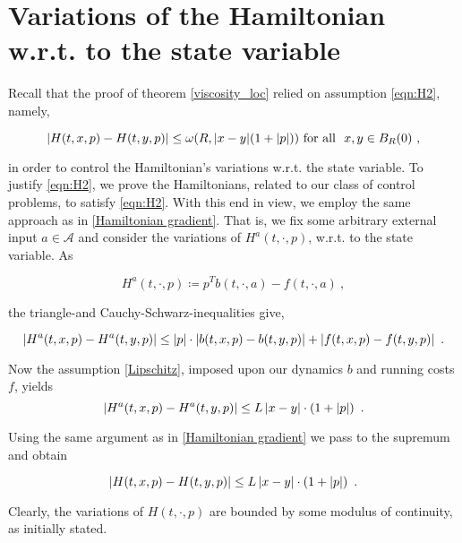 \section{Variations of the Hamiltonian w.r.t. to the state variable}
\label{state hamiltonian}

Recall that the proof of theorem \ref{viscosity_loc} relied on assumption \eqref{eqn:H2}, namely,

\begin{equation*}
	\lvert H(t, x, p) - H(t, y, p) \rvert \leq \omega(R, \lvert x - y \rvert (1 + \lvert p \rvert)) \hbox{ for all } \ x, y \in B_R(0) \ ,
\end{equation*}

in order to control the Hamiltonian's variations w.r.t. the state variable. To justify \eqref{eqn:H2}, we prove the Hamiltonians, related to our class of control problems, to satisfy \eqref{eqn:H2}. With this end in view, we employ the same approach as in \ref{Hamiltonian gradient}. That is, we fix some arbitrary external input $ a \in \mathcal{A} $ and consider the variations of
$ H^{a}(t, \cdot, p) $, w.r.t. to the state variable. As

\begin{equation*}
	H^{a}(t, \cdot, p) \coloneqq p^{T} b(t, \cdot, a) - f(t, \cdot, a) \ ,
\end{equation*}

the triangle-and Cauchy-Schwarz-inequalities give,

\begin{equation*}
	\left\lvert {H^{a}(t, x, p) - H^{a}(t, y, p) } \right\rvert \leq \left\lvert {p} \right\rvert \cdot \left\lvert {b(t, x, p) - b(t, y, p)} \right\rvert + \left\lvert {f(t, x, p) - f(t, y, p)} \right\rvert \ .
\end{equation*}

Now the assumption \eqref{Lipschitz}, imposed upon our dynamics $ b $ and running costs $ f $, yields
\begin{equation*}
	\normof{H^{a}(t, x, p) - H^{a}(t, y, p) } \leq L \normof{x - y} \cdot \left(1 + \normof{p }\right) \ .
\end{equation*}

Using the same argument as in \ref{Hamiltonian gradient} we pass to the supremum and obtain

\begin{equation*}
	\left\lvert {H(t, x, p) - H(t, y, p) } \right\rvert \leq L \left\lvert {x - y} \right\rvert \cdot \left(1 + \left\lvert {p } \right\rvert\right) \ .
\end{equation*}

Clearly, the variations of $ H(t, \cdot, p) $ are bounded by some modulus of continuity, as initially stated.

